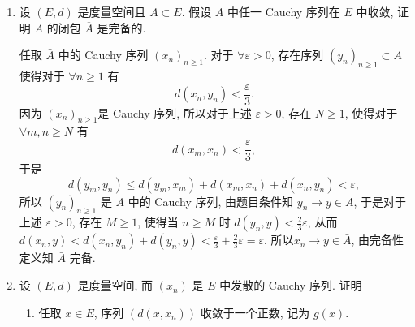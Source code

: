 \begin{enumerate}
  \item 设 $(E,d)$ 是度量空间且 $A\subset E$. 假设 $A$ 中任一 Cauchy 序列在 $E$ 中收敛,
  证明 $A$ 的闭包 $\overline{A}$ 是完备的.
    \begin{answer}
      任取 $\bar{A}$ 中的 Cauchy 序列 $(x_n)_{n\geq 1}$.
      对于 $\forall\varepsilon>0$, 存在序列 $(y_n)_{n\geq 1}\subset A$ 使得对于 $\forall n\geq 1$ 有
      \[d(x_n,y_n)<\frac{\varepsilon}{3}.\]
      因为 $(x_n)_{n\geq 1}$是 Cauchy 序列, 所以对于上述 $\varepsilon>0$,
      存在 $N\geq 1$, 使得对于 $\forall m,n\geq N$ 有
      \[d(x_m,x_n)<\frac{\varepsilon}{3},\]
      于是
      \[d(y_m,y_n)\leq d(y_m,x_m)+d(x_m,x_n)+d(x_n,y_n)<\varepsilon,\]
      所以 $(y_n)_{n\geq 1}$ 是 $A$ 中的 Cauchy 序列, 由题目条件知 $y_n\to y\in\bar{A}$,
      于是对于上述 $\varepsilon>0$, 存在 $M\geq 1$, 使得当 $n\geq M$ 时 $d(y_n,y)<\frac{2}{3}\varepsilon$,
      从而 $d(x_n,y)<d(x_n,y_n)+d(y_n,y)<\frac{\varepsilon}{3}+\frac{2}{3}\varepsilon=\varepsilon$.
      所以$x_n\to y\in\bar{A}$, 由完备性定义知 $\bar{A}$ 完备.
    \end{answer}
  \item 设 $(E,d)$ 是度量空间, 而 $(x_n)$ 是 $E$ 中发散的 Cauchy 序列. 证明
    \begin{enumerate}
        \item 任取 $x\in E$, 序列 $(d(x,x_n))$ 收敛于一个正数, 记为 $g(x)$.

\end{enumerate}
\end{enumerate}
